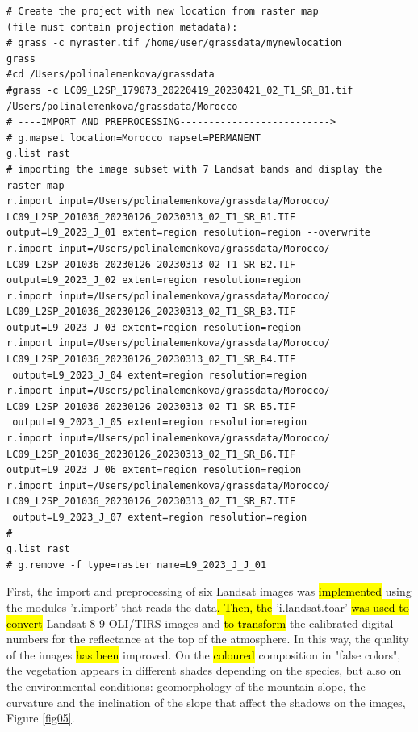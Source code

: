 \documentclass[geomatics,article,submit,pdftex,moreauthors]{Definitions/mdpi}
\begin{document}
\begin{footnotesize}
\begin{verbatim}
# Create the project with new location from raster map 
(file must contain projection metadata):
# grass -c myraster.tif /home/user/grassdata/mynewlocation
grass
#cd /Users/polinalemenkova/grassdata
#grass -c LC09_L2SP_179073_20220419_20230421_02_T1_SR_B1.tif 
/Users/polinalemenkova/grassdata/Morocco
# ----IMPORT AND PREPROCESSING-------------------------->
# g.mapset location=Morocco mapset=PERMANENT
g.list rast
# importing the image subset with 7 Landsat bands and display the raster map
r.import input=/Users/polinalemenkova/grassdata/Morocco/
LC09_L2SP_201036_20230126_20230313_02_T1_SR_B1.TIF 
output=L9_2023_J_01 extent=region resolution=region --overwrite
r.import input=/Users/polinalemenkova/grassdata/Morocco/
LC09_L2SP_201036_20230126_20230313_02_T1_SR_B2.TIF 
output=L9_2023_J_02 extent=region resolution=region
r.import input=/Users/polinalemenkova/grassdata/Morocco/
LC09_L2SP_201036_20230126_20230313_02_T1_SR_B3.TIF 
output=L9_2023_J_03 extent=region resolution=region
r.import input=/Users/polinalemenkova/grassdata/Morocco/
LC09_L2SP_201036_20230126_20230313_02_T1_SR_B4.TIF
 output=L9_2023_J_04 extent=region resolution=region
r.import input=/Users/polinalemenkova/grassdata/Morocco/
LC09_L2SP_201036_20230126_20230313_02_T1_SR_B5.TIF
 output=L9_2023_J_05 extent=region resolution=region
r.import input=/Users/polinalemenkova/grassdata/Morocco/
LC09_L2SP_201036_20230126_20230313_02_T1_SR_B6.TIF 
output=L9_2023_J_06 extent=region resolution=region
r.import input=/Users/polinalemenkova/grassdata/Morocco/
LC09_L2SP_201036_20230126_20230313_02_T1_SR_B7.TIF
 output=L9_2023_J_07 extent=region resolution=region
#
g.list rast
# g.remove -f type=raster name=L9_2023_J_J_01
\end{verbatim}
\end{footnotesize}

First, the import and preprocessing of six Landsat images was \hl{implemented} using the modules 'r.import' that reads the data\hl{. Then, the }'i.landsat.toar' \hl{was used to convert} Landsat 8-9 OLI/TIRS images and \hl{to transform} the calibrated digital numbers for the reflectance at the top of the atmosphere. In this way, the quality of the images \hl{has been} improved. On the \hl{coloured} composition in "false colors", the vegetation appears in different shades depending on the species, but also on the environmental conditions: geomorphology of the mountain slope, the curvature and the inclination of the slope that affect the shadows on the images, Figure \ref{fig05}.
\end{document}

